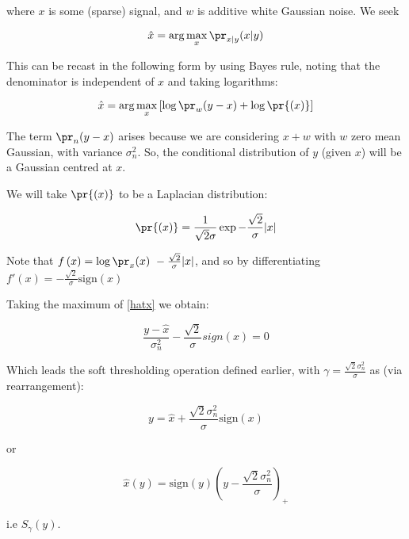 where \(x\) is some (sparse) signal, and \(w\) is additive white Gaussian noise. We seek

\begin{equation}
\hat{x} = \arg\max_x \pr_{x|y}{\left(x|y\right)}
\end{equation}

This can be recast in the following form by using Bayes rule, noting that the denominator is independent of \(x\) and taking logarithms:

\begin{equation}
\hat{x} = \arg\max_x \left[\log{\pr_{w}{\left(y-x\right)}}+\log{\pr{\left(x\right)}}\right]
\label{hatx}
\end{equation}

The term \(\pr_{n}{\left(y-x\right)}\) arises because we are considering \(x+w\) with \(w\) zero mean Gaussian, with variance \(\sigma_n^2\). So, the conditional distribution of \(y\) (given \(x\)) will be a Gaussian centred at \(x\).

We will take \(\pr{\left(x\right)}\) to be a Laplacian distribution:

\begin{equation}
\pr{\left(x\right)} = \frac{1}{\sqrt{2}\sigma}\exp{-\frac{\sqrt{2}}{\sigma}|x|}
\end{equation}

Note that \( f\left(x\right) = \log{\pr_x{ \left( x \right)}} ~ -\frac{\sqrt{2}}{\sigma} |x| \), and so by differentiating \( f'\left(x\right) = -\frac{\sqrt{2}}{\sigma} \mathrm{sign}\left(x\right) \)

Taking the maximum of \ref{hatx} we obtain:

\begin{equation}
\frac{y-\hat{x}}{\sigma^2_n}-\frac{\sqrt{2}}{\sigma}sign(x) = 0
\end{equation}

Which leads the soft thresholding operation defined earlier, with \(\gamma = \frac{\sqrt{2}\sigma^2_n}{\sigma}\) as (via rearrangement):

$$
y =  \hat{x} + \frac{\sqrt{2}\sigma^2_n}{\sigma}\mathrm{sign}\left(x\right)
$$

or

$$
\hat{x}\left(y\right) = \mathrm{sign}(y)\left(y - \frac{\sqrt{2}\sigma^2_n}{\sigma}\right)_+
$$

i.e \(S_\gamma(y)\).